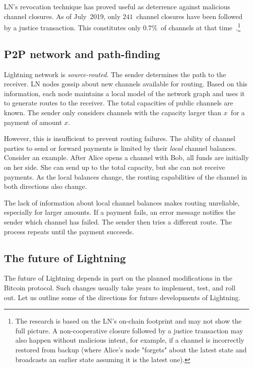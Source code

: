 LN's revocation technique has proved useful as deterrence against malicious channel closures.
As of July~2019, only $241$~channel closures have been followed by a justice transaction.
This constitutes only $0.7\%$~of channels at that time~\cite{BitMEXLN3}.\footnote{The research is based on the LN's on-chain footprint and may not show the full picture. A non-cooperative closure followed by a justice transaction may also happen without malicious intent, for example, if a channel is incorrectly restored from backup (where Alice's node "forgets" about the latest state and broadcasts an earlier state assuming it is the latest one).}


\subsection{P2P network and path-finding}

Lightning network is \textit{source-routed}.
The sender determines the path to the receiver.
LN nodes gossip about new channels available for routing.
Based on this information, each node maintains a local model of the network graph and uses it to generate routes to the receiver.
The total capacities of public channels are known.
The sender only considers channels with the capacity larger than $x$~for a payment of amount $x$.

However, this is insufficient to prevent routing failures.
The ability of channel parties to send or forward payments is limited by their \textit{local} channel balances.
Consider an example.
After Alice opens a channel with Bob, all funds are initially on her side.
She can send up to the total capacity, but she can not receive payments.
As the local balances change, the routing capabilities of the channel in both directions also change.

The lack of information about local channel balances makes routing unreliable, especially for larger amounts.
If a payment fails, an error message notifies the sender which channel has failed.
The sender then tries a different route.
The process repeats until the payment succeeds.


\subsection{The future of Lightning}

The future of Lightning depends in part on the planned modifications in the Bitcoin protocol.
Such changes usually take years to implement, test, and roll out.
Let us outline some of the directions for future developments of Lightning.

